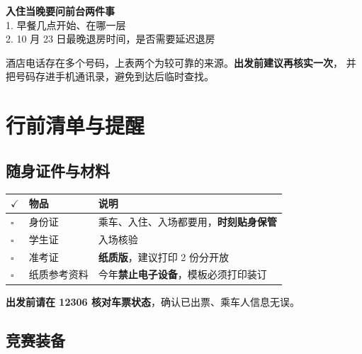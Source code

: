 \documentclass[11pt,a4paper,fontset=windows]{ctexart}
\newcommand{\thd}[1]{\textbf{\color{main}#1}}   %
\begin{document}
\begin{keybox}
\textbf{入住当晚要问前台两件事}\\
1. 早餐几点开始、在哪一层\\
2. 10 月 23 日最晚退房时间，是否需要延迟退房
\end{keybox}

\begin{warnbox}
酒店电话存在多个号码，上表两个为较可靠的来源。\textbf{出发前建议再核实一次}，
并把号码存进手机通讯录，避免到达后临时查找。
\end{warnbox}

\section{行前清单与提醒}\label{sec:remind}

\subsection{随身证件与材料}

\begin{center}
\begin{tabularx}{\textwidth}{@{}L{0.9cm}L{4.2cm}X@{}}
\toprule
\thd{$\checkmark$} & \thd{物品} & \thd{说明}\\
\midrule
$\square$ & 身份证 & 乘车、入住、入场都要用，\textbf{时刻贴身保管}\\
$\square$ & 学生证 & 入场核验\\
$\square$ & 准考证 & \textbf{纸质版}，建议打印 2 份分开放\\
$\square$ & 纸质参考资料 & 今年\textbf{禁止电子设备}，模板必须打印装订\\
\bottomrule
\end{tabularx}
\end{center}

\begin{warnbox}
\textbf{出发前请在 12306 核对车票状态}，确认已出票、乘车人信息无误。
\end{warnbox}

\subsection{竞赛装备}
\end{document}
